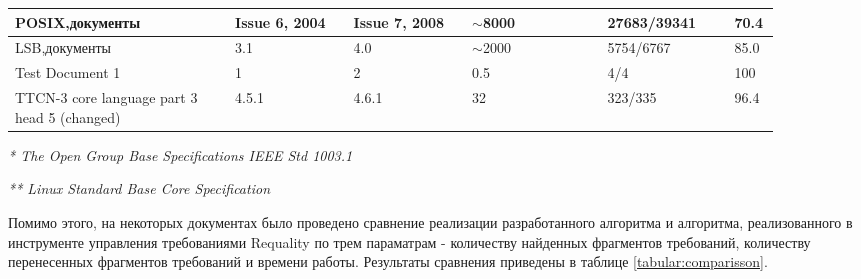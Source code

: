 \begin{table}[H]
\begin{center}
\begin{tabular}{|p{0.26\linewidth}|p{0.14\linewidth}|p{0.14\linewidth}|p{0.16\linewidth}|p{0.15\linewidth}|p{0.04\linewidth}|}
\hline
POSIX, документы & Issue 6, 2004 & Issue 7, 2008 & $\sim$8000 & 27683/39341 & 70.4\\
\hline
LSB, документы & 3.1 & 4.0 & $\sim$2000 & 5754/6767 & 85.0\\
\hline
Test Document 1 & 1 & 2 & 0.5 & 4/4 & 100 \\
\hline
TTCN-3 core language part 3 head 5 (changed) & 4.5.1 & 4.6.1 & 32 & 323/335 & 96.4\\
\hline
\end{tabular}
\end{center}
\emph{* The Open Group Base Specifications IEEE Std 1003.1}

\emph{** Linux Standard Base Core Specification}
\end{table}

Помимо этого, на некоторых документах было проведено сравнение реализации разработанного алгоритма и алгоритма, реализованного в инструменте управления требованиями Requality по трем параматрам - количеству найденных фрагментов требований, количеству перенесенных фрагментов требований и времени работы. Результаты сравнения приведены в таблице \ref{tabular:comparisson}.

